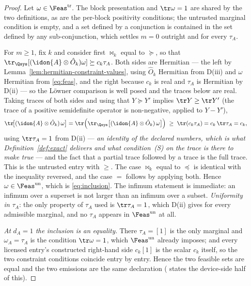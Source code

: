 \begin{proof}
Let $\omega\in\Feas^{\mathrm{tr}}$. The block presentation and $\tr\omega=1$
are shared by the two definitions, as are the per-block positivity conditions;
the untrusted marginal condition is empty, and a set defined by a conjunction
is contained in the set defined by any sub-conjunction, which settles $m=0$
outright and for every $\tau_A$.

For $m\ge1$, fix $k$ and consider first
$\bowtie_k$ equal to $\succeq$, so that
$\tr_{\Qsys}[(\idon{A}\otimes\hat O_k)\omega]\succeq c_k\tau_A$. Both sides are
Hermitian --- the left by Lemma~\ref{lem:hermitian-constraint-values}, using
$\hat O_k$ Hermitian from D(iii) and $\omega$ Hermitian from \eqref{eq:feas},
and the right because $c_k$ is real and $\tau_A$ is Hermitian by D(ii) --- so
the L\"owner comparison is well posed and the traces below are real. Taking
traces of both sides and using that $Y\succeq Y'$ implies $\tr Y\ge\tr Y'$
(the trace of a positive semidefinite operator is non-negative, applied to
$Y-Y'$),
\begin{equation*}
  \tr\!\big[(\idon{A}\otimes\hat O_k)\,\omega\big]
  =\tr\Big(\tr_{\Qsys}\big[(\idon{A}\otimes\hat O_k)\,\omega\big]\Big)
  \;\ge\;\tr(c_k\tau_A)=c_k\,\tr\tau_A=c_k ,
\end{equation*}
using $\tr\tau_A=1$ from D(ii) --- \emph{an identity of the declared numbers,
which is what Definition~\ref{def:exact} delivers and what condition~(S) on the
trace is there to make true} --- and the fact that a partial trace followed by
a trace is the full trace. This is the untrusted entry with $\ge$. The case
$\bowtie_k$ equal to $\preceq$ is identical with the inequality reversed, and
the case $=$ follows by applying both. Hence $\omega\in\Feas^{\mathrm{un}}$,
which is \eqref{eq:inclusion}. The infimum
statement is immediate: an infimum over a superset is not larger than an
infimum over a subset. \emph{Uniformity in $\tau_A$}: the only property of
$\tau_A$ used is $\tr\tau_A=1$, which D(ii) gives for every admissible
marginal, and no $\tau_A$ appears in $\Feas^{\mathrm{un}}$ at all.

\emph{At $d_A=1$ the inclusion is an equality.} There $\tau_A=[1]$ is the only
marginal and $\omega_A=\tau_A$ is the condition $\tr\omega=1$, which
$\Feas^{\mathrm{un}}$ already imposes; and every licensed entry's constructed
right-hand side $c_k[1]$ is the scalar $c_k$ itself, so the two constraint
conditions coincide entry by entry. Hence the two feasible sets are equal and
the two emissions are the same declaration ( states
the device-side half of this).
\end{proof}
